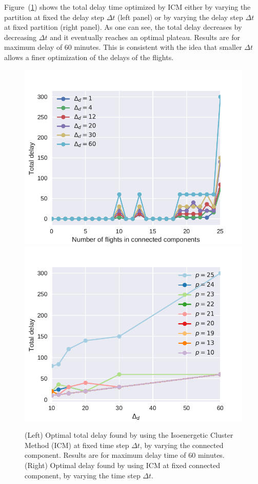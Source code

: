 Figure~(\ref{fig:icm1}) shows the total delay time optimized by ICM either by 
varying the partition at fixed the delay step $\Delta t$ (left panel) or by
varying the delay step $\Delta t$ at fixed partition (right panel). As one can
see, the total delay decreases by decreasing $\Delta t$ and it eventually
reaches an optimal plateau. Results are for maximum delay of 60 minutes. This is
consistent with the idea that smaller $\Delta t$ allows a finer optimization of
the delays of the flights.\\

\begin{figure}
  \includegraphics[width=\columnwidth]{pics/qubo_icm/qubo_icm_3.pdf}
  \includegraphics[width=\columnwidth]{pics/qubo_icm/qubo_icm_4.pdf}
  \caption{(Left) Optimal total delay found by using the
  Isoenergetic Cluster Method (ICM) at fixed time step $\Delta t$, by varying
  the connected component. Results are for maximum delay time of $60$ minutes. (Right)
  Optimal delay found by using ICM at fixed connected component, by varying the time step
  $\Delta t$.}
\label{fig:icm1}
\end{figure}

